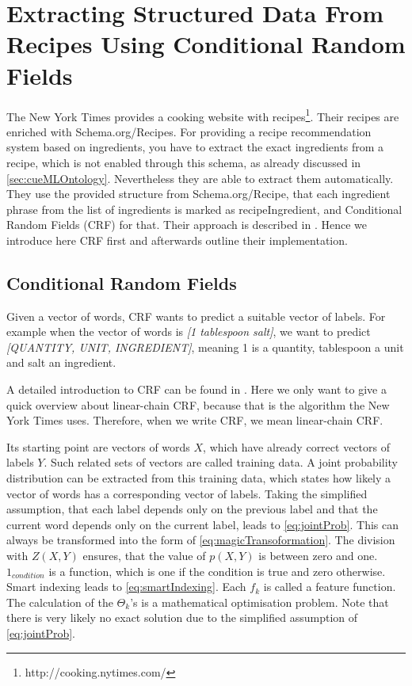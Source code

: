 \documentclass[12pt, twoside]{report}
\begin{document}
\section{Extracting Structured Data From Recipes Using Conditional Random Fields}\label{sec:crfzeit}
The New York Times provides a cooking website with recipes\footnote{http://cooking.nytimes.com/}. Their recipes are enriched with Schema.org/Recipes. For providing a recipe recommendation system based on ingredients, you have to extract the exact ingredients from a recipe, which is not enabled through this schema, as already discussed in \cref{sec:cueMLOntology}. Nevertheless they are able to extract them automatically. They use the provided structure from Schema.org/Recipe, that each ingredient phrase from the list of ingredients is marked as recipeIngredient, and Conditional Random Fields (CRF) for that. Their approach is described in \parencite{CRFZeit}. Hence we introduce here CRF first and afterwards outline their implementation.  

\subsection{Conditional Random Fields}
Given a vector of words, CRF wants to predict a suitable vector of labels. For example when the vector of words is \textit{[1 tablespoon salt]}, we want to predict \textit{[QUANTITY, UNIT, INGREDIENT]}, meaning 1 is a quantity, tablespoon a unit and salt an ingredient.

A detailed introduction to CRF can be found in \parencite{CRFIntroduction}. Here we only want to give a quick overview about linear-chain CRF, because that is the algorithm the New York Times uses. Therefore, when we write CRF, we mean linear-chain CRF.

Its starting point are vectors of words $X$, which have already correct vectors of labels $Y$. Such related sets of vectors are called training data. A joint probability distribution can be extracted from this training data, which states how likely a vector of words has a corresponding vector of labels. Taking the simplified assumption, that each label depends only on the previous label and that the current word depends only on the current label, leads to \cref{eq:jointProb}. This can always be transformed into the form of \cref{eq:magicTransoformation}. The division with $Z(X,Y)$ ensures, that the value of $p(X,Y)$ is between zero and one. $1_{condition}$ is a function, which is one if the condition is true and zero otherwise. Smart indexing leads to \cref{eq:smartIndexing}. Each $f_k$ is called a feature function. The calculation of the $\Theta_k$'s is a mathematical optimisation problem. Note that there is very likely no exact solution due to the simplified assumption of \cref{eq:jointProb}.
\end{document}
